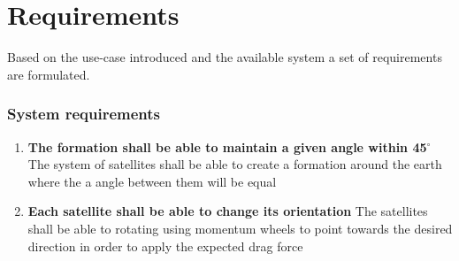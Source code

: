 \chapter{Requirements}\label{chap:requirements}
Based on the use-case introduced and the available system a set of requirements are formulated.
%
\subsection*{System requirements}
%
\begin{enumerate}
	\item \textbf{The formation shall be able to maintain a given angle within 45$^{\circ}$}
	The system of satellites shall be able to create a formation around the earth where the a angle between them will be equal   
		\item \textbf{Each satellite shall be able to change its orientation}
	The satellites shall be able to rotating using momentum wheels to point towards the desired direction in order to apply the expected drag force  	
\end{enumerate}

